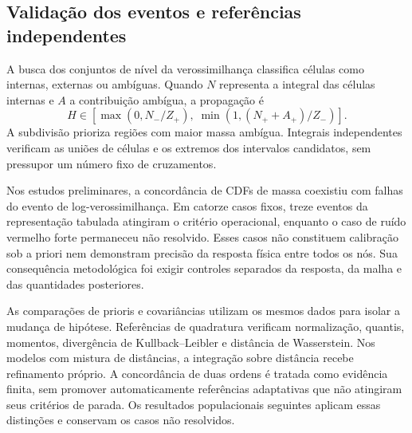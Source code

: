 \subsection{Validação dos eventos e referências independentes}

A busca dos conjuntos de nível da verossimilhança classifica células como internas, externas ou ambíguas. Quando $N$ representa a integral das células internas e $A$ a contribuição ambígua, a propagação é
\begin{equation}
 H\in\left[\max(0,N_-/Z_+),\;\min(1,(N_++A_+)/Z_-)\right].
 \label{eq:c09-intervalo-evento}
\end{equation}
A subdivisão prioriza regiões com maior massa ambígua. Integrais independentes verificam as uniões de células e os extremos dos intervalos candidatos, sem pressupor um número fixo de cruzamentos.

Nos estudos preliminares, a concordância de CDFs de massa coexistiu com falhas do evento de log-verossimilhança. Em catorze casos fixos, treze eventos da representação tabulada atingiram o critério operacional, enquanto o caso de ruído vermelho forte permaneceu não resolvido. Esses casos não constituem calibração sob a priori nem demonstram precisão da resposta física entre todos os nós. Sua consequência metodológica foi exigir controles separados da resposta, da malha e das quantidades posteriores.

As comparações de prioris e covariâncias utilizam os mesmos dados para isolar a mudança de hipótese. Referências de quadratura verificam normalização, quantis, momentos, divergência de Kullback--Leibler e distância de Wasserstein. Nos modelos com mistura de distâncias, a integração sobre distância recebe refinamento próprio. A concordância de duas ordens é tratada como evidência finita, sem promover automaticamente referências adaptativas que não atingiram seus critérios de parada. Os resultados populacionais seguintes aplicam essas distinções e conservam os casos não resolvidos.



